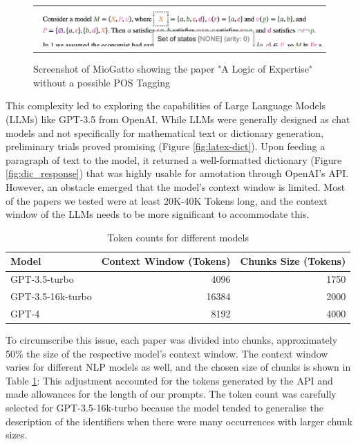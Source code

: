 \begin{figure}[htpb]
  \centering
  \begin{tabular}{c}
  \includegraphics[width=14cm]{images/POS_failed.png}
  \end{tabular}
  \caption[POS Tagging Left]{Screenshot of MioGatto showing the paper "A Logic of Expertise" without a possible POS Tagging}\label{fig:POS_failed}
\end{figure}

This complexity led to exploring the capabilities of Large Language Models (LLMs) like GPT-3.5 from OpenAI. While LLMs were generally designed as chat models and not specifically for mathematical text or dictionary generation, preliminary trials proved promising (Figure \ref{fig:latex-dict}). Upon feeding a paragraph of text to the model, it returned a well-formatted dictionary (Figure \ref{fig:dic_response}) that was highly usable for annotation through OpenAI's API. However, an obstacle emerged that the model's context window is limited. Most of the papers we tested were at least 20K-40K Tokens long, and the context window of the LLMs needs to be more significant to accommodate this.

\begin{table}[h]
    \centering
    \begin{tabular}{lrr}
        \hline
        Model & Context Window (Tokens) & Chunks Size (Tokens)\\
        \hline
        GPT-3.5-turbo & 4096 & 1750 \\
        GPT-3.5-16k-turbo & 16384 & 2000 \\
        GPT-4 & 8192 & 4000 \\
        \hline
    \end{tabular}
    \caption{Token counts for different models}
    \label{tab:token_counts}
\end{table}

To circumscribe this issue, each paper was divided into chunks, approximately 50\% the size of the respective model's context window. The context window varies for different \ac{NLP} models as well, and the chosen size of chunks is shown in Table \ref{tab:token_counts}: This adjustment accounted for the tokens generated by the API and made allowances for the length of our prompts. The token count was carefully selected for GPT-3.5-16k-turbo because the model tended to generalise the description of the identifiers when there were many occurrences with larger chunk sizes.

